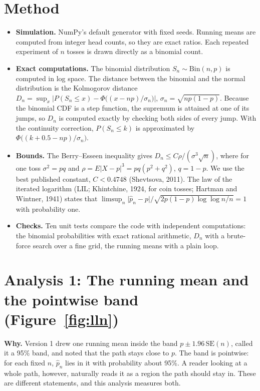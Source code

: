 \documentclass[11pt,a4paper]{article}
\begin{document}
\section{Method}

\begin{itemize}
  \item \textbf{Simulation.} NumPy's default generator with fixed seeds. Running means are computed from integer head counts,
  so they are exact ratios. Each repeated experiment of $n$ tosses is drawn directly as a binomial count.
  \item \textbf{Exact computations.} The binomial distribution $S_n \sim \mathrm{Bin}(n,p)$ is computed in log space. The
  distance between the binomial and the normal distribution is the Kolmogorov distance
  $D_n = \sup_x \lvert P(S_n \le x) - \Phi\bigl((x-np)/\sigma_n\bigr)\rvert$, $\sigma_n = \sqrt{np(1-p)}$. Because the
  binomial CDF is a step function, the supremum is attained at one of its jumps, so $D_n$ is computed exactly by checking
  both sides of every jump. With the continuity correction, $P(S_n \le k)$ is approximated by $\Phi\bigl((k+0.5-np)/\sigma_n\bigr)$.
  \item \textbf{Bounds.} The Berry--Esseen inequality gives $D_n \le C\rho/(\sigma^3\sqrt n)$, where for one toss
  $\sigma^2 = pq$ and $\rho = E|X-p|^3 = pq(p^2+q^2)$, $q = 1-p$. We use the best published constant, $C < 0.4748$
  (Shevtsova, 2011). The law of the iterated logarithm (LIL; Khintchine, 1924, for coin tosses; Hartman and Wintner, 1941)
  states that $\limsup_n \lvert\hat p_n - p\rvert / \sqrt{2p(1-p)\log\log n/n} = 1$ with probability one.
  \item \textbf{Checks.} Ten unit tests compare the code with independent computations: the binomial probabilities with exact
  rational arithmetic, $D_n$ with a brute-force search over a fine grid, the running means with a plain loop.
\end{itemize}

\section{Analysis 1: The running mean and the pointwise band (Figure~\ref{fig:lln})}

\textbf{Why.} Version 1 drew one running mean inside the band $p \pm 1.96\,\mathrm{SE}(n)$, called it a 95\% band, and noted
that the path stays close to $p$. The band is pointwise: for each fixed $n$, $\hat p_n$ lies in it with probability about
95\%. A reader looking at a whole path, however, naturally reads it as a region the path should stay in. These are different
statements, and this analysis measures both.
\end{document}
